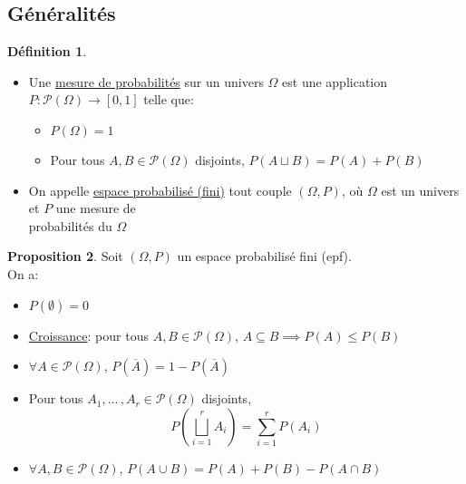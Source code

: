 \documentclass[10pt,a4paper]{article}
\theoremstyle{definition}
\newtheorem{proposition}{Proposition}[section]
\newtheorem{definition}[proposition]{Définition}
\begin{document}
\subsection{Généralités}
\begin{definition}
\hfill
\begin{itemize}
\item Une \uline{mesure de probabilités} sur un univers $\Omega$ est une application $P: \mathcal{P}(\Omega) \to [0, 1]$ telle que:
\begin{itemize}
\item $P(\Omega) = 1$
\item Pour tous $A, B \in \mathcal{P}(\Omega)$ disjoints, $P(A \sqcup B) = P(A) + P(B)$
\end{itemize}
\item On appelle \uline{espace probabilisé (fini)} tout couple $(\Omega, P)$, où $\Omega$ est un univers et $P$ une mesure de \\
probabilités du $\Omega$
\end{itemize}
\end{definition}
\begin{proposition}
Soit $(\Omega, P)$ un espace probabilisé fini (epf). \\
On a:
\begin{itemize}
\item $P(\emptyset) = 0$
\item \uline{Croissance}: pour tous $A, B \in \mathcal{P}(\Omega)$, $A \subseteq B \implies P(A) \leq P(B)$
\item $\forall A \in \mathcal{P}(\Omega)$, $P(\overline{A}) = 1 - P(\overline{A})$
\item Pour tous $A_1, ...\,, A_r \in \mathcal{P}(\Omega)$ disjoints, \[P\left( \bigsqcup\limits_{i = 1}^r A_i \right) = \sum\limits_{i = 1}^r P(A_i)\]
\item $\forall A, B \in \mathcal{P}(\Omega)$, $P(A \cup B) = P(A) + P(B) - P(A \cap B)$
\end{itemize}
\end{proposition}

\pagebreak
\end{document}
